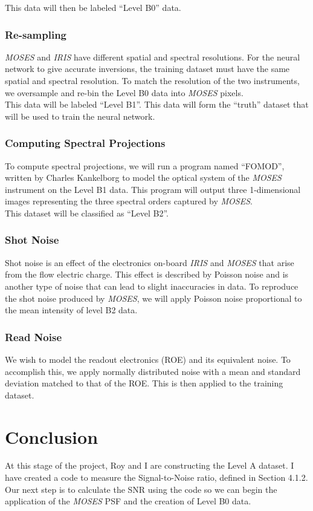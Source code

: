 \documentclass[10pt,a4paper,titlepage]{article}
\begin{document}
				This data will then be labeled ``Level B0'' data.
			
			\subsubsection{Re-sampling}
				\textit{MOSES} and \textit{IRIS} have different spatial and spectral resolutions. For the neural network to give accurate inversions, the training dataset must have the same spatial and spectral resolution. To match the resolution of the two instruments, we oversample and re-bin the Level B0 data into \textit{MOSES} pixels.\\
			
				This data will be labeled ``Level B1''. This data will form the ``truth'' dataset that will be used to train the neural network.
			
			\subsubsection{Computing Spectral Projections}
				To compute spectral projections, we will run a program named ``FOMOD'', written by Charles Kankelborg to model the optical system of the \textit{MOSES} instrument on the Level B1 data. This program will output three 1-dimensional images representing the three spectral orders captured by \textit{MOSES}.\\
				
				This dataset will be classified as ``Level B2''.

			\subsubsection{Shot Noise}
				Shot noise is an effect of the electronics on-board \textit{IRIS} and \textit{MOSES} that arise from the flow electric charge. This effect is described by Poisson noise and is another type of noise that can lead to slight inaccuracies in data. To reproduce the shot noise produced by \textit{MOSES}, we will apply Poisson noise proportional to the mean intensity of level B2 data.
			
			\subsubsection{Read Noise}
				We wish to model the readout electronics (ROE) and its equivalent noise. To accomplish this, we apply normally distributed noise with a mean and standard deviation matched to that of the ROE. This is then applied to the training dataset.
			
	\section{Conclusion}
		At this stage of the project, Roy and I are constructing the Level A dataset. I have created a code to measure the Signal-to-Noise ratio, defined in Section 4.1.2. Our next step is to calculate the SNR using the code so we can begin the application of the \textit{MOSES} PSF and the creation of Level B0 data.
		
	
	
\end{document}
